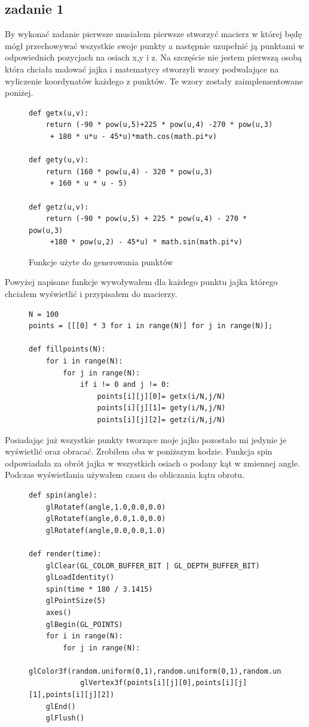 \documentclass[]{article}
\begin{document}
\subsection{zadanie 1}
By wykonać zadanie pierwsze musiałem pierwsze stworzyć macierz w której będę mógł przechowywać wszystkie swoje punkty a następnie uzupełnić ją punktami w odpowiednich pozycjach na osiach x,y i z. Na szczęście nie jestem pierwszą osobą która chciała malować jajka i matematycy stworzyli wzory podwalające na wyliczenie koordynatów każdego z punktów. Te wzory zostały zaimplementowane poniżej.
\begin{figure}[H]
	\begin{verbatim}
def getx(u,v):
    return (-90 * pow(u,5)+225 * pow(u,4) -270 * pow(u,3)
     + 180 * u*u - 45*u)*math.cos(math.pi*v)

def gety(u,v):
    return (160 * pow(u,4) - 320 * pow(u,3)
     + 160 * u * u - 5)

def getz(u,v):
    return (-90 * pow(u,5) + 225 * pow(u,4) - 270 * pow(u,3)
     +180 * pow(u,2) - 45*u) * math.sin(math.pi*v)
\end{verbatim}
\caption{Funkcje użyte do generowania punktów}
\end{figure}
Powyżej napisane funkcje wywoływałem dla każdego punktu jajka którego chciałem wyświetlić i przypisałem do macierzy.
\begin{figure}[H]
	\begin{verbatim}
N = 100
points = [[[0] * 3 for i in range(N)] for j in range(N)];

def fillpoints(N):
    for i in range(N):
        for j in range(N):
            if i != 0 and j != 0:
                points[i][j][0]= getx(i/N,j/N)
                points[i][j][1]= gety(i/N,j/N)
                points[i][j][2]= getz(i/N,j/N)
	\end{verbatim}
\end{figure}
Posiadając już wszystkie punkty tworzące moje jajko pozostało mi jedynie je wyświetlić oraz obracać. Zrobiłem oba w poniższym kodzie. Funkcja spin odpowiadała za obrót jajka w wszystkich osiach o podany kąt w zmiennej angle. Podczas wyświetlania używałem czasu do obliczania kątu obrotu.
\begin{figure}[H]
\begin{verbatim}
def spin(angle):
    glRotatef(angle,1.0,0.0,0.0)
    glRotatef(angle,0.0,1.0,0.0)
    glRotatef(angle,0.0,0.0,1.0)

def render(time):
    glClear(GL_COLOR_BUFFER_BIT | GL_DEPTH_BUFFER_BIT)
    glLoadIdentity()
    spin(time * 180 / 3.1415)
    glPointSize(5)
    axes()
    glBegin(GL_POINTS)
    for i in range(N):
        for j in range(N):
            glColor3f(random.uniform(0,1),random.uniform(0,1),random.uniform(0,1))
            glVertex3f(points[i][j][0],points[i][j][1],points[i][j][2])
    glEnd()
    glFlush()
	
\end{verbatim}
\end{figure}
\end{document}
